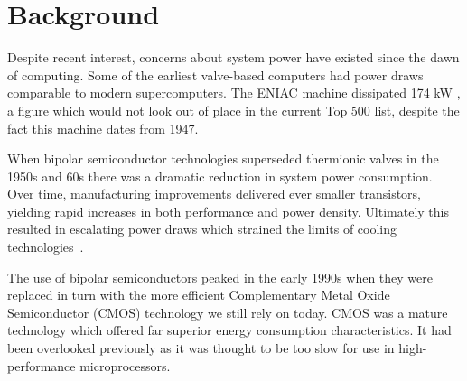 \section{Background}
\label{sec:background}
Despite recent interest, concerns about system power have existed since the dawn of computing. Some of the earliest valve-based computers had power draws comparable to modern supercomputers. The ENIAC machine dissipated 174 kW \cite{birnbaum:2000aa}, a figure which would not look out of place in the current Top 500 list, despite the fact this machine dates from 1947.\golden

When bipolar semiconductor technologies superseded thermionic valves in the 1950s and 60s there was a dramatic reduction in system power consumption. Over time, manufacturing improvements delivered ever smaller transistors, yielding rapid increases in both performance and power density. Ultimately this resulted in escalating power draws which strained the limits of cooling technologies~\cite{jouppi:1994aa}. \golden

The use of bipolar semiconductors peaked in the early 1990s when they were replaced in turn with the more efficient Complementary Metal Oxide Semiconductor (CMOS) technology we still rely on today. CMOS was a mature technology which offered far superior energy consumption characteristics. It had been  overlooked previously as it was thought to be too slow for use in high-performance microprocessors. \golden

